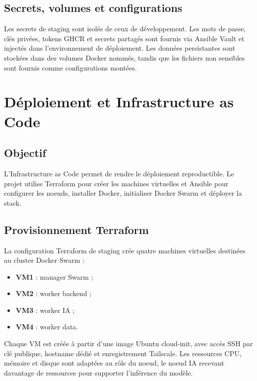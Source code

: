 ﻿\documentclass[12pt, a4paper]{report}
\begin{document}
\section{Secrets, volumes et configurations}

Les secrets de staging sont isolés de ceux de développement. Les mots de passe,
clés privées, tokens GHCR et secrets partagés sont fournis via Ansible Vault et
injectés dans l'environnement de déploiement. Les données persistantes sont
stockées dans des volumes Docker nommés, tandis que les fichiers non sensibles
sont fournis comme configurations montées.


\chapter{Déploiement et Infrastructure as Code}

\section{Objectif}

L'Infrastructure as Code permet de rendre le déploiement reproductible. Le projet
utilise Terraform pour créer les machines virtuelles et Ansible pour configurer
les noeuds, installer Docker, initialiser Docker Swarm et déployer la stack.

\section{Provisionnement Terraform}

La configuration Terraform de staging crée quatre machines virtuelles destinées
au cluster Docker Swarm :

\begin{itemize}
  \item \textbf{VM1} : manager Swarm ;
  \item \textbf{VM2} : worker backend ;
  \item \textbf{VM3} : worker IA ;
  \item \textbf{VM4} : worker data.
\end{itemize}

Chaque VM est créée à partir d'une image Ubuntu cloud-init, avec accès SSH par
clé publique, hostname dédié et enregistrement Tailscale. Les ressources CPU,
mémoire et disque sont adaptées au rôle du noeud, le noeud IA recevant davantage
de ressources pour supporter l'inférence du modèle.
\end{document}

